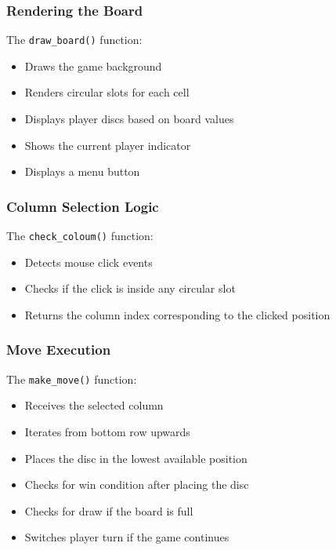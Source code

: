 \documentclass[12pt,letterpaper]{article}
\begin{document}
\subsubsection{Rendering the Board}
The \texttt{draw\_board()} function:
\begin{itemize}
\item Draws the game background
\item Renders circular slots for each cell
\item Displays player discs based on board values
\item Shows the current player indicator
\item Displays a menu button
\end{itemize}
\subsubsection{Column Selection Logic}
The \texttt{check\_coloum()} function:
\begin{itemize}
\item Detects mouse click events
\item Checks if the click is inside any circular slot
\item Returns the column index corresponding to the clicked position
\end{itemize}
\subsubsection{Move Execution}
The \texttt{make\_move()} function:
\begin{itemize}
\item Receives the selected column
\item Iterates from bottom row upwards
\item Places the disc in the lowest available position
\item Checks for win condition after placing the disc
\item Checks for draw if the board is full
\item Switches player turn if the game continues
\end{itemize}
\end{document}
